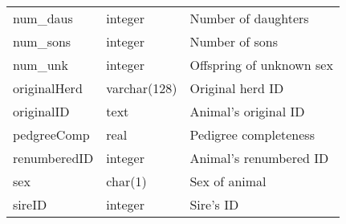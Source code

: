 \begin{center}
\begin{table}
{\begin{tabular}{llp{2.5in}}
            num\_daus     &   integer       &  Number of daughters \\
            num\_sons     &   integer       &  Number of sons \\
            num\_unk      &   integer       &  Offspring of unknown sex \\
            originalHerd  &   varchar(128)  &  Original herd ID \\
            originalID    &   text          &  Animal's original ID \\
            pedgreeComp   &   real          &  Pedigree completeness \\
            renumberedID  &   integer       &  Animal's renumbered ID \\
            sex           &   char(1)       &  Sex of animal \\
            sireID        &   integer       &  Sire's ID \\
            \hline
        \end{tabular}}
    \end{table}
\end{center}
